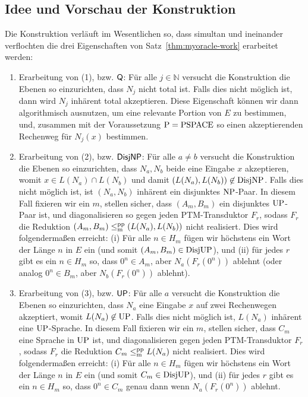 \subsection*{Idee und Vorschau der Konstruktion}

Die Konstruktion verläuft im Wesentlichen so, dass simultan und ineinander verflochten die drei Eigenschaften von Satz~\ref{thm:myoracle-work} erarbeitet werden:
\begin{enumerate}[label=\arabic*.,midpenalty=0,endpenalty=0]

    \item Erarbeitung von (1), bzw. $\mathsf{Q}$: Für alle $j\in\mathbb N$ versucht die Konstruktion die Ebenen so einzurichten, dass $N_j$ nicht total ist.
        Falls dies nicht möglich ist, dann wird $N_j$ inhärent total akzeptieren. Diese Eigenschaft können wir dann algorithmisch ausnutzen, um eine relevante Portion von $E$ zu bestimmen, und, zusammen mit der Voraussetzung $\mathrm{P}=\mathrm{PSPACE}$ so einen akzeptierenden Rechenweg für $N_j(x)$ bestimmen.

    \item Erarbeitung von (2), bzw. $\mathsf{DisjNP}$: Für alle $a\neq b$ versucht die Konstruktion die Ebenen so einzurichten, dass $N_a, N_b$ beide eine Eingabe $x$ akzeptieren, womit $x\in L(N_a)\cap L(N_b)$ und damit $(L(N_a), L(N_b))\not\in \mathrm{DisjNP}$.
        Falls dies nicht möglich ist, ist $(N_a, N_b)$ inhärent ein disjunktes $\mathrm{NP}$-Paar.
        In diesem Fall fixieren wir ein $m$, stellen sicher, dass $(A_m,B_m)$ ein disjunktes $\mathrm{UP}$-Paar ist, und diagonalisieren so gegen jeden PTM-Transduktor $F_r$, sodass $F_r$ die Reduktion $(A_m, B_m)\leq_\mathrm{m}^\mathrm{pp} (L(N_a), L(N_b))$ nicht realisiert.
        Dies wird folgendermaßen erreicht: (i) Für alle $n\in H_m$ fügen wir höchstens ein Wort der Länge $n$ in $E$ ein (und somit $(A_m, B_m)\in\mathrm{DisjUP}$), und (ii) für jedes $r$ gibt es ein $n\in H_m$ so, dass $0^{n}\in A_m$, aber $N_a(F_r(0^n))$ ablehnt (oder analog $0^n\in B_m$, aber $N_b(F_r(0^n))$ ablehnt).

    \item Erarbeitung von (3), bzw. $\mathsf{UP}$: Für alle $a$ versucht die Konstruktion die Ebenen so einzurichten, dass $N_a$ eine Eingabe $x$ auf zwei Rechenwegen akzeptiert, womit  $L(N_a)\not\in \mathrm{UP}$.
        Falls dies nicht möglich ist, $L(N_a)$ inhärent eine $\mathrm{UP}$-Sprache.
        In diesem Fall fixieren wir ein $m$, stellen sicher, dass $C_m$ eine Sprache in $\mathrm{UP}$ ist, und diagonalisieren gegen jeden PTM-Transduktor $F_r$, sodass $F_r$ die Reduktion $C_m\leq_\mathrm{m}^\mathrm{pp} L(N_a)$ nicht realisiert.
        Dies wird folgendermaßen erreicht: (i) Für alle $n\in H_m$ fügen wir höchstens ein Wort der Länge $n$ in $E$ ein (und somit $C_m\in\mathrm{DisjUP}$), und (ii) für jedes $r$ gibt es ein $n\in H_m$ so, dass $0^{n}\in C_m$ genau dann wenn $N_a(F_r(0^n))$ ablehnt.
\end{enumerate}
